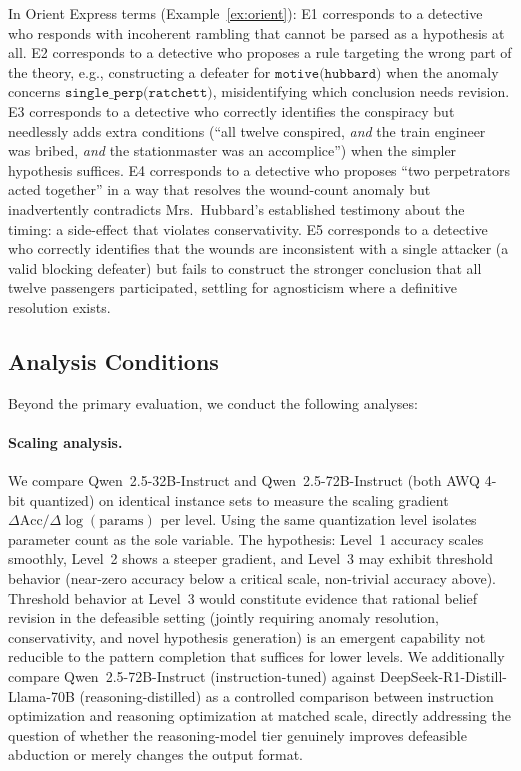 \documentclass{article}
\theoremstyle{definition}
\begin{document}
In Orient Express terms (Example~\ref{ex:orient}): E1 corresponds to a detective who responds with incoherent rambling that cannot be parsed as a hypothesis at all. E2 corresponds to a detective who proposes a rule targeting the wrong part of the theory, e.g., constructing a defeater for $\texttt{motive(hubbard)}$ when the anomaly concerns $\texttt{single\_perp(ratchett)}$, misidentifying which conclusion needs revision. E3 corresponds to a detective who correctly identifies the conspiracy but needlessly adds extra conditions (``all twelve conspired, \emph{and} the train engineer was bribed, \emph{and} the stationmaster was an accomplice'') when the simpler hypothesis suffices. E4 corresponds to a detective who proposes ``two perpetrators acted together'' in a way that resolves the wound-count anomaly but inadvertently contradicts Mrs.\ Hubbard's established testimony about the timing: a side-effect that violates conservativity. E5 corresponds to a detective who correctly identifies that the wounds are inconsistent with a single attacker (a valid blocking defeater) but fails to construct the stronger conclusion that all twelve passengers participated, settling for agnosticism where a definitive resolution exists.


\subsection{Analysis Conditions}\label{subsec:analysis}

Beyond the primary evaluation, we conduct the following analyses:

\paragraph{Scaling analysis.} We compare Qwen~2.5-32B-Instruct and Qwen~2.5-72B-Instruct (both AWQ 4-bit quantized) on identical instance sets to measure the scaling gradient $\Delta\mathrm{Acc} / \Delta\log(\text{params})$ per level. Using the same quantization level isolates parameter count as the sole variable. The hypothesis: Level~1 accuracy scales smoothly, Level~2 shows a steeper gradient, and Level~3 may exhibit threshold behavior (near-zero accuracy below a critical scale, non-trivial accuracy above). Threshold behavior at Level~3 would constitute evidence that rational belief revision in the defeasible setting (jointly requiring anomaly resolution, conservativity, and novel hypothesis generation) is an emergent capability not reducible to the pattern completion that suffices for lower levels. We additionally compare Qwen~2.5-72B-Instruct (instruction-tuned) against DeepSeek-R1-Distill-Llama-70B (reasoning-distilled) as a controlled comparison between instruction optimization and reasoning optimization at matched scale, directly addressing the question of whether the reasoning-model tier genuinely improves defeasible abduction or merely changes the output format.
\end{document}
